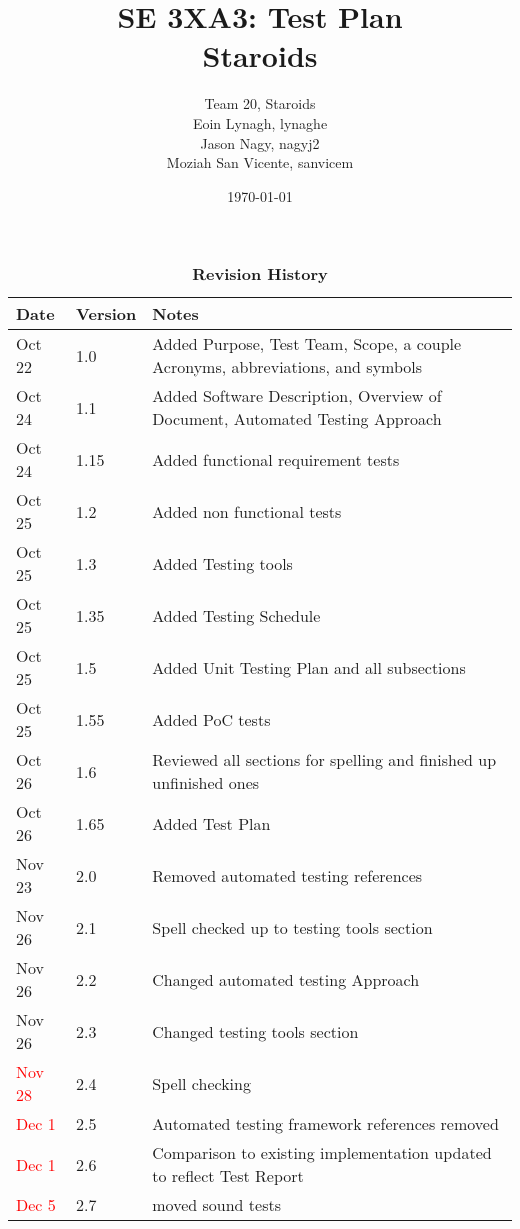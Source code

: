 \documentclass[12pt, titlepage]{article}
\title{SE 3XA3: Test Plan\\Staroids}
\author{Team 20, Staroids
		\\ Eoin Lynagh, lynaghe
		\\ Jason Nagy, nagyj2
		\\ Moziah San Vicente, sanvicem
}
\date{\today}
\begin{document}
\maketitle

\tableofcontents
\listoftables
\listoffigures

\begin{table}[h]
\caption{\bf Revision History}
\begin{tabularx}{\textwidth}{p{3cm}p{2cm}X}
\toprule {\bf Date} & {\bf Version} & {\bf Notes}\\
\midrule
Oct 22 & 1.0 & Added Purpose, Test Team, Scope, a couple Acronyms, abbreviations, and symbols\\
Oct 24 & 1.1 & Added Software Description, Overview of Document, Automated Testing Approach\\
Oct 24 & 1.15 & Added functional requirement tests\\
Oct 25 & 1.2 & Added non functional tests\\
Oct 25 & 1.3 & Added Testing tools\\
Oct 25 & 1.35 & Added Testing Schedule\\
Oct 25 & 1.5 & Added Unit Testing Plan and all subsections\\
Oct 25 & 1.55 & Added PoC tests\\
Oct 26 & 1.6 & Reviewed all sections for spelling and finished up unfinished ones\\
Oct 26 & 1.65 & Added Test Plan\\
Nov 23 & 2.0 & Removed automated testing references\\
Nov 26 & 2.1 & Spell checked up to testing tools section\\
Nov 26 & 2.2 & Changed automated testing Approach\\
Nov 26 & 2.3 & Changed testing tools section\\
\textcolor{red}{Nov 28} & 2.4 & Spell checking\\
\textcolor{red}{Dec 1} & 2.5 & Automated testing framework references removed\\
\textcolor{red}{Dec 1} & 2.6 & Comparison to existing implementation updated to reflect Test Report\\
\textcolor{red}{Dec 5} & 2.7 & moved sound tests\\
\bottomrule
\end{tabularx}
\end{table}

\newpage

\end{document}
